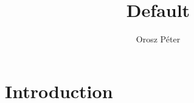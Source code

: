 \documentclass[10pt]{article}
\author{Orosz Péter}
\title{Default}
\begin{document}
	\maketitle \newpage
	\tableofcontents \newpage {}
	\section{Introduction}
\end{document}
